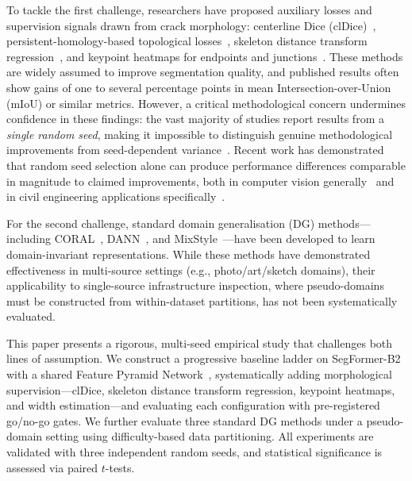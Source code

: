 To tackle the first challenge, researchers have proposed auxiliary losses and supervision signals drawn from crack morphology: centerline Dice (clDice)~\cite{shit2021cldice}, persistent-homology-based topological losses~\cite{clough2020topological, hu2019topology}, skeleton distance transform regression~\cite{audebert2019distance}, and keypoint heatmaps for endpoints and junctions~\cite{sun2019crackjunction}. These methods are widely assumed to improve segmentation quality, and published results often show gains of one to several percentage points in mean Intersection-over-Union (mIoU) or similar metrics. However, a critical methodological concern undermines confidence in these findings: the vast majority of studies report results from a \emph{single random seed}, making it impossible to distinguish genuine methodological improvements from seed-dependent variance~\cite{picard2021seed, henderson2018rl}. Recent work has demonstrated that random seed selection alone can produce performance differences comparable in magnitude to claimed improvements, both in computer vision generally~\cite{picard2021seed} and in civil engineering applications specifically~\cite{alsabbagh2024randomness}.

For the second challenge, standard domain generalisation (DG) methods---including CORAL~\cite{sun2016coral}, DANN~\cite{ganin2016dann}, and MixStyle~\cite{zhou2021mixstyle}---have been developed to learn domain-invariant representations. While these methods have demonstrated effectiveness in multi-source settings (e.g., photo/art/sketch domains), their applicability to single-source infrastructure inspection, where pseudo-domains must be constructed from within-dataset partitions, has not been systematically evaluated.

This paper presents a rigorous, multi-seed empirical study that challenges both lines of assumption. We construct a progressive baseline ladder on SegFormer-B2~\cite{xie2021segformer} with a shared Feature Pyramid Network~\cite{lin2017fpn}, systematically adding morphological supervision---clDice, skeleton distance transform regression, keypoint heatmaps, and width estimation---and evaluating each configuration with pre-registered go/no-go gates. We further evaluate three standard DG methods under a pseudo-domain setting using difficulty-based data partitioning. All experiments are validated with three independent random seeds, and statistical significance is assessed via paired $t$-tests.

